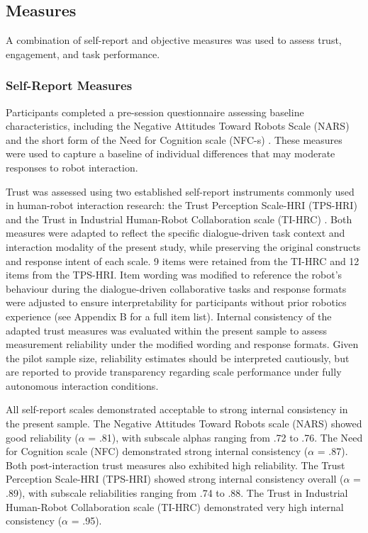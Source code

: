 \documentclass[
]{article}
\begin{document}
\subsection{Measures}\label{measures}

A combination of self-report and objective measures was used to assess
trust, engagement, and task performance.

\subsubsection{Self-Report Measures}\label{self-report-measures}

Participants completed a pre-session questionnaire assessing baseline
characteristics, including the Negative Attitudes Toward Robots Scale
(NARS) and the short form of the Need for Cognition scale (NFC-s)
\autocite{cacioppo1982,nomura}. These measures were used to capture a
baseline of individual differences that may moderate responses to robot
interaction.

Trust was assessed using two established self-report instruments
commonly used in human-robot interaction research: the Trust Perception
Scale-HRI (TPS-HRI) and the Trust in Industrial Human-Robot
Collaboration scale (TI-HRC) \autocite{schaefer2016,charalambous2016}.
Both measures were adapted to reflect the specific dialogue-driven task
context and interaction modality of the present study, while preserving
the original constructs and response intent of each scale. 9 items were
retained from the TI-HRC and 12 items from the TPS-HRI. Item wording was
modified to reference the robot's behaviour during the dialogue-driven
collaborative tasks and response formats were adjusted to ensure
interpretability for participants without prior robotics experience (see
Appendix B for a full item list). Internal consistency of the adapted
trust measures was evaluated within the present sample to assess
measurement reliability under the modified wording and response formats.
Given the pilot sample size, reliability estimates should be interpreted
cautiously, but are reported to provide transparency regarding scale
performance under fully autonomous interaction conditions.

All self-report scales demonstrated acceptable to strong internal
consistency in the present sample. The Negative Attitudes Toward Robots
scale (NARS) showed good reliability (\(\alpha\) = .81), with subscale
alphas ranging from .72 to .76. The Need for Cognition scale (NFC)
demonstrated strong internal consistency (\(\alpha\) = .87). Both
post-interaction trust measures also exhibited high reliability. The
Trust Perception Scale-HRI (TPS-HRI) showed strong internal consistency
overall (\(\alpha\) = .89), with subscale reliabilities ranging from .74
to .88. The Trust in Industrial Human-Robot Collaboration scale (TI-HRC)
demonstrated very high internal consistency (\(\alpha\) = .95).
\end{document}
